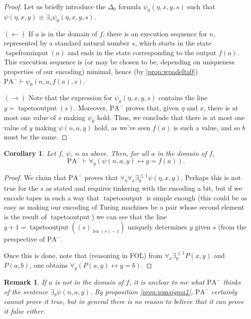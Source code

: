 \documentclass{article}
\newtheorem{corollary}[theorem]{Corollary}
\newtheorem{remark}[theorem]{Remark}
\theoremstyle{nonumberplain}
\newtheorem{proof}{Proof}
\newcommand{\PA}{\mathrm{PA}}
\newcommand{\WPA}{\PA^-}
\DeclareMathOperator{\tapefrominput}{tapefrominput}
\DeclareMathOperator{\tapetooutput}{tapetooutput}
\DeclareMathOperator{\len}{len}
\begin{document}
\begin{proof}
Let us briefly introduce the $\Delta_0$ formula $\psi_0(\eta,x,y,s)$ such that $\psi(\eta,x,y) \equiv \exists_s \psi_0(\eta,x,y,s)$.

$(\leftarrow)$ If $a$ is in the domain of $f$, there is an execution sequence for $n$, represented by a standard natural number $s$, which starts in the state $\tapefrominput(a)$ and ends in the state corresponding to the output $f(a)$. This execution sequence is (or may be chosen to be, depending on uniqueness properties of our encoding) minimal, hence (by \ref{prop:wpadelta0}) $\WPA \vdash \psi_0(n,a,f(a),s)$.

$(\rightarrow)$ Note that the expression for $\psi_0(\eta,x,y,s)$ contains the line $y = \tapetooutput(s)$. Moreover, $\WPA$ proves that, given $\eta$ and $x$, there is at most one value of $s$ making $\psi_0$ hold. Thus, we conclude that there is at most one value of $y$ making $\psi(n,a,y)$ hold, as we've seen $f(a)$ is such a value, and so $b$ must be the same.
\end{proof}

\begin{corollary}\label{cor:psin}
Let $f$, $\psi$, $n$ as above. Then, for all $a$ in the domain of $f$,
\begin{equation}
\WPA \vdash \forall_y (\psi(n,a,y) \leftrightarrow y=f(a)).
\end{equation}
\end{corollary}

\begin{proof}
We claim that $\WPA$ proves that $\forall_\eta \forall_x \exists^{\leq 1}_y \psi(\eta,x,y)$. Perhaps this is not true for the $s$ as stated and requires tinkering with the encoding a bit, but if we encode tapes in such a way that $\tapetooutput$ is simple enough (this could be as easy as making our encoding of Turing machines be a pair whose second element is the result of $\tapetooutput$) we can see that the line $y+1 = \tapetooutput((s)_{\len(s)-1})$ uniquely determines $y$ given $s$ (from the perspective of $\WPA$.

Once this is done, note that (reasoning in FOL) from $\forall_x \exists^{\leq 1}_y P(x,y)$ and $P(a,b)$, one obtains $\forall_y (P(a,y) \leftrightarrow y=b)$.
\end{proof}

\begin{remark}
If $a$ is not in the domain of $f$, it is unclear to me what $\WPA$ thinks of the sentence $\exists_y \psi(n,a,y)$. By proposition \ref{prop:wpasigma1}, $\WPA$ certainly cannot prove it true, but in general there is no reason to believe that it can prove it false either.
\end{remark}
\end{document}
